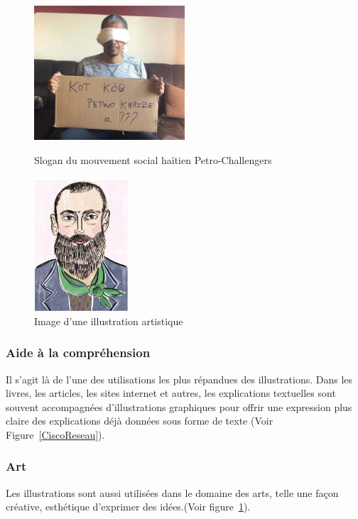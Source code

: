 \begin{figure}[ht]
	\begin{minipage}{0.45\textwidth}
		\centering
		\includegraphics[height=5cm]{Pictures/PetroChallengerSlogan.jpg}
		\caption{Slogan du mouvement social ha\"itien Petro-Challengers\cite{PetroChallenger}}
		\label{Petrochallengers}
	\end{minipage}
	\hspace{10pt}
	\begin{minipage}{0.45\textwidth}
		\centering
		\includegraphics[height=5cm]{Pictures/IllustrationCommeArt.png}
		\caption{Image d'une illustration artistique\cite{ArtIllustre}}
		\label{IllustrationArt}
	\end{minipage}
\end{figure}

\subsubsection{Aide \`a la compr\'ehension}
Il s'agit l\`a de l'une des utilisations les plus r\'epandues des illustrations. Dans les livres, les articles, les sites internet et autres, les explications textuelles sont souvent accompagn\'ees d'illustrations graphiques pour offrir une expression plus claire des explications d\'ej\`a donn\'ees sous forme de texte (Voir Figure~\ref{CiscoReseau}).

\subsubsection{Art}
Les illustrations sont aussi utilis\'ees dans le domaine des arts, telle une fa\c{c}on cr\'eative, esth\'etique d'exprimer des id\'ees.(Voir figure~\ref{IllustrationArt}).


